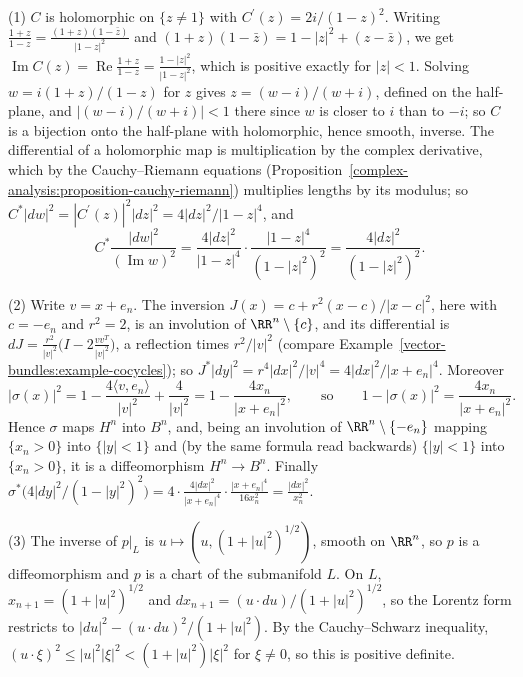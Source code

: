 \begin{solution}
(1) $C$ is holomorphic on $\{z \neq 1\}$ with $C^{\prime}(z) = 2i/(1 - z)^2$. Writing $\frac{1 + z}{1 - z} = \frac{(1 + z)(1 - \bar z)}{|1 - z|^2}$ and $(1 + z)(1 - \bar z) = 1 - |z|^2 + (z - \bar z)$, we get
$\operatorname{Im}C(z) = \operatorname{Re}\frac{1 + z}{1 - z} = \frac{1 - |z|^2}{|1 - z|^2}$, which is positive exactly for $|z| < 1$. Solving $w = i(1 + z)/(1 - z)$ for $z$ gives $z = (w - i)/(w + i)$, defined
on the half-plane, and $|(w - i)/(w + i)| < 1$ there since $w$ is closer to $i$ than to $-i$; so $C$ is a bijection onto the half-plane with holomorphic, hence smooth, inverse. The differential of
a holomorphic map is multiplication by the complex derivative, which by the Cauchy--Riemann equations (Proposition~\ref{complex-analysis:proposition-cauchy-riemann}) multiplies lengths by its modulus;
so $C^*|dw|^2 = |C^{\prime}(z)|^2|dz|^2 = 4|dz|^2/|1 - z|^4$, and
\[
C^*\frac{|dw|^2}{(\operatorname{Im}w)^2} = \frac{4|dz|^2}{|1 - z|^4} \cdot \frac{|1 - z|^4}{(1 - |z|^2)^2} = \frac{4|dz|^2}{(1 - |z|^2)^2} .
\]

(2) Write $v = x + e_n$. The inversion $J(x) = c + r^2(x - c)/|x - c|^2$, here with $c = -e_n$ and $r^2 = 2$, is an involution of $\RR^n \setminus \{c\}$, and its differential is
$dJ = \frac{r^2}{|v|^2}\bigl(I - 2\frac{vv^T}{|v|^2}\bigr)$, a reflection times $r^2/|v|^2$ (compare Example~\ref{vector-bundles:example-cocycles}); so $J^*|dy|^2 = r^4|dx|^2/|v|^4 = 4|dx|^2/|x + e_n|^4$.
Moreover
\[
|\sigma(x)|^2 = 1 - \frac{4\langle v, e_n\rangle}{|v|^2} + \frac{4}{|v|^2} = 1 - \frac{4x_n}{|x + e_n|^2}, \qquad\text{so}\qquad 1 - |\sigma(x)|^2 = \frac{4x_n}{|x + e_n|^2} .
\]
Hence $\sigma$ maps $H^n$ into $B^n$, and, being an involution of $\RR^n \setminus \{-e_n\}$ mapping $\{x_n > 0\}$ into $\{|y| < 1\}$ and (by the same formula read backwards) $\{|y| < 1\}$ into
$\{x_n > 0\}$, it is a diffeomorphism $H^n \to B^n$. Finally
$\sigma^*\bigl(4|dy|^2/(1 - |y|^2)^2\bigr) = 4 \cdot \frac{4|dx|^2}{|x + e_n|^4} \cdot \frac{|x + e_n|^4}{16x_n^2} = \frac{|dx|^2}{x_n^2}$.

(3) The inverse of $p|_L$ is $u \mapsto (u, (1 + |u|^2)^{1/2})$, smooth on $\RR^n$, so $p$ is a diffeomorphism and $p$ is a chart of the submanifold $L$. On $L$, $x_{n+1} = (1 + |u|^2)^{1/2}$ and
$dx_{n+1} = (u \cdot du)/(1 + |u|^2)^{1/2}$, so the Lorentz form restricts to $|du|^2 - (u \cdot du)^2/(1 + |u|^2)$. By the Cauchy--Schwarz inequality, $(u \cdot \xi)^2 \leq |u|^2|\xi|^2 < (1 + |u|^2)|\xi|^2$ for
$\xi \neq 0$, so this is positive definite.


\end{solution}
